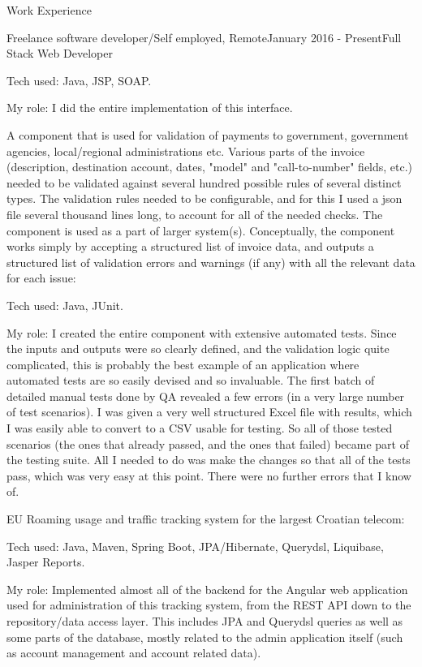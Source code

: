 \documentclass{resume}
\begin{document}
\begin{rSection}{Work Experience}
\begin{rSubsection}{Freelance software developer/Self employed, Remote}{January 2016 - Present}{Full Stack Web Developer}{}
\begin{rList}
\item Tech used: Java, JSP, SOAP.
\item My role: I did the entire implementation of this interface.
\end{rList}

A component that is used for validation of payments to government, government agencies, local/regional administrations etc. Various parts of the invoice (description, destination account, dates, "model" and "call-to-number" fields, etc.) needed to be validated against several hundred possible rules of several distinct types. The validation rules needed to be configurable, and for this I used a json file several thousand lines long, to account for all of the needed checks. The component is used as a part of larger system(s). Conceptually, the component works simply by accepting a structured list of invoice data, and outputs a structured list of validation errors and warnings (if any) with all the relevant data for each issue:

\begin{rList}
\item Tech used: Java, JUnit.
\item My role: I created the entire component with extensive automated tests. Since the inputs and outputs were so clearly defined, and the validation logic quite complicated, this is probably the best example of an application where automated tests are so easily devised and so invaluable. The first batch of detailed manual tests done by QA revealed a few errors (in a very large number of test scenarios). I was given a very well structured Excel file with results, which I was easily able to convert to a CSV usable for testing. So all of those tested scenarios (the ones that already passed, and the ones that failed) became part of the testing suite. All I needed to do was make the changes so that all of the tests pass, which was very easy at this point. There were no further errors that I know of.
\end{rList}

EU Roaming usage and traffic tracking system for the largest Croatian telecom:

\begin{rList}
\item Tech used: Java, Maven, Spring Boot, JPA/Hibernate, Querydsl, Liquibase, Jasper Reports.
\item My role: Implemented almost all of the backend for the Angular web application used for administration of this tracking system, from the REST API down to the repository/data access layer. This includes JPA and Querydsl queries as well as some parts of the database, mostly related to the admin application itself (such as account management and account related data).
\end{rList}


\end{rSubsection}
\end{rSection}
\end{document}
